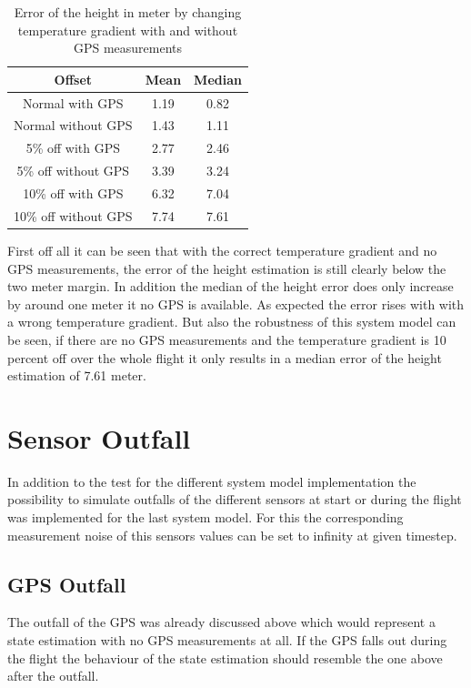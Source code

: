 \begin{table}[h!]
\centering
\begin{tabular}{ccc}
\hline
\multicolumn{1}{|c|}{Offset} & \multicolumn{1}{|c|}{Mean}& \multicolumn{1}{|c|}{Median} \\ \hline
Normal with GPS 	& 1.19 		& 0.82\\
Normal without GPS	& 1.43	 	& 1.11\\
5\% off with GPS 	& 2.77	 	& 2.46\\
5\% off without GPS 	& 3.39	 	& 3.24\\
10\% off with GPS 	& 6.32	 	& 7.04\\
10\% off without GPS 	& 7.74 		& 7.61
\end{tabular}
\caption{Error of the height in meter by changing temperature gradient with and without GPS measurements}
\label{tab:ErrorChangingTempGradWithWithoutGPS}
\end{table}

First off all it can be seen that with the correct temperature gradient and no GPS measurements,
the error of the height estimation is still clearly below the two meter margin.
In addition the median of the height error does only increase by around one meter it no GPS is available.
As expected the error rises with with a wrong temperature gradient.
But also the robustness of this system model can be seen, if there are no GPS measurements
and the temperature gradient is 10 percent off over the whole flight it only results in a median error of the height estimation of 7.61 meter.

\section{Sensor Outfall}
In addition to the test for the different system model implementation
the possibility to simulate outfalls of the different sensors at start or during the flight was implemented for the last system model.
For this the corresponding measurement noise of this sensors values can be set to infinity at given timestep.

\subsection{GPS Outfall}
The outfall of the GPS was already discussed above which would represent a state estimation with no GPS measurements at all.
If the GPS falls out during the flight the behaviour of the state estimation should resemble the one above after the outfall.

